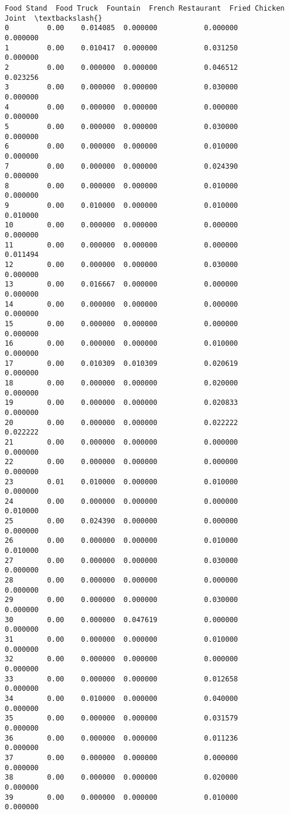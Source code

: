 \documentclass[11pt]{article}
\begin{document}
\begin{tcolorbox}[breakable, size=fbox, boxrule=.5pt, pad at break*=1mm, opacityfill=0]
\begin{Verbatim}[commandchars=\\\{\}]
    Food Stand  Food Truck  Fountain  French Restaurant  Fried Chicken Joint  \textbackslash{}
0         0.00    0.014085  0.000000           0.000000             0.000000
1         0.00    0.010417  0.000000           0.031250             0.000000
2         0.00    0.000000  0.000000           0.046512             0.023256
3         0.00    0.000000  0.000000           0.030000             0.000000
4         0.00    0.000000  0.000000           0.000000             0.000000
5         0.00    0.000000  0.000000           0.030000             0.000000
6         0.00    0.000000  0.000000           0.010000             0.000000
7         0.00    0.000000  0.000000           0.024390             0.000000
8         0.00    0.000000  0.000000           0.010000             0.000000
9         0.00    0.010000  0.000000           0.010000             0.010000
10        0.00    0.000000  0.000000           0.000000             0.000000
11        0.00    0.000000  0.000000           0.000000             0.011494
12        0.00    0.000000  0.000000           0.030000             0.000000
13        0.00    0.016667  0.000000           0.000000             0.000000
14        0.00    0.000000  0.000000           0.000000             0.000000
15        0.00    0.000000  0.000000           0.000000             0.000000
16        0.00    0.000000  0.000000           0.010000             0.000000
17        0.00    0.010309  0.010309           0.020619             0.000000
18        0.00    0.000000  0.000000           0.020000             0.000000
19        0.00    0.000000  0.000000           0.020833             0.000000
20        0.00    0.000000  0.000000           0.022222             0.022222
21        0.00    0.000000  0.000000           0.000000             0.000000
22        0.00    0.000000  0.000000           0.000000             0.000000
23        0.01    0.010000  0.000000           0.010000             0.000000
24        0.00    0.000000  0.000000           0.000000             0.010000
25        0.00    0.024390  0.000000           0.000000             0.000000
26        0.00    0.000000  0.000000           0.010000             0.010000
27        0.00    0.000000  0.000000           0.030000             0.000000
28        0.00    0.000000  0.000000           0.000000             0.000000
29        0.00    0.000000  0.000000           0.030000             0.000000
30        0.00    0.000000  0.047619           0.000000             0.000000
31        0.00    0.000000  0.000000           0.010000             0.000000
32        0.00    0.000000  0.000000           0.000000             0.000000
33        0.00    0.000000  0.000000           0.012658             0.000000
34        0.00    0.010000  0.000000           0.040000             0.000000
35        0.00    0.000000  0.000000           0.031579             0.000000
36        0.00    0.000000  0.000000           0.011236             0.000000
37        0.00    0.000000  0.000000           0.000000             0.000000
38        0.00    0.000000  0.000000           0.020000             0.000000
39        0.00    0.000000  0.000000           0.010000             0.000000


\end{Verbatim}
\end{tcolorbox}
\end{document}
